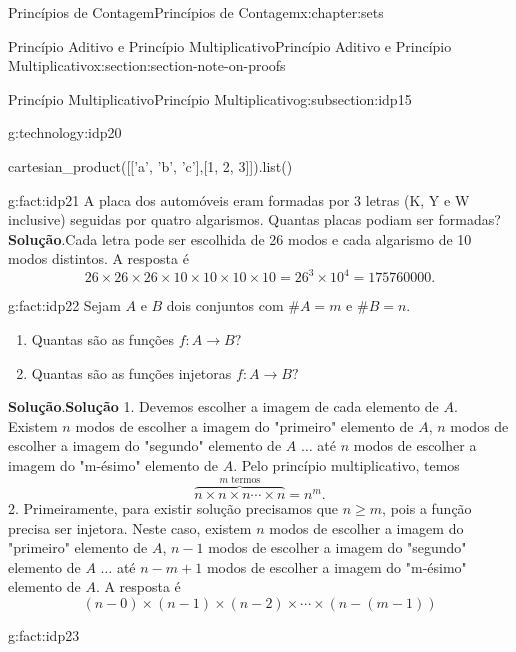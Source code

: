 \documentclass[oneside,10pt,]{book}
\newcommand{\blocktitlefont}{\relax}
\newcommand{\terminology}[1]{\textbf{#1}}
\numberwithin{equation}{section}
\begin{document}
\begin{chapterptx}{Princípios de Contagem}{}{Princípios de Contagem}{}{}{x:chapter:sets}
\begin{sectionptx}{Princípio Aditivo e Princípio Multiplicativo}{}{Princípio Aditivo e Princípio Multiplicativo}{}{}{x:section:section-note-on-proofs}
\begin{subsectionptx}{Princípio Multiplicativo}{}{Princípio Multiplicativo}{}{}{g:subsection:idp15}
\begin{technology}{}{g:technology:idp20}
\begin{sageinput}
cartesian_product([['a', 'b', 'c'],[1, 2, 3]]).list()
\end{sageinput}
\begin{sageoutput}
[('a', 1),
 ('a', 2),
 ('a', 3),
 ('b', 1),
 ('b', 2),
 ('b', 3),
 ('c', 1),
 ('c', 2),
 ('c', 3)]
\end{sageoutput}
\end{technology}
\begin{fact}{}{}{g:fact:idp21}%
A placa dos automóveis eram formadas por 3 letras (K, Y e W inclusive) seguidas por quatro algarismos. Quantas placas podiam ser formadas?%
\textbf{\blocktitlefont Solução}.\quad{}Cada letra pode ser escolhida de 26 modos e cada algarismo de 10 modos distintos. A resposta é%
\begin{equation*}
26\times26\times26\times 10\times10\times10\times10 = 26^3\times10^4 = 175760000.
\end{equation*}
%
\end{fact}
\begin{fact}{}{}{g:fact:idp22}%
Sejam \(A\) e \(B\) dois conjuntos com \(\#A=m\) e \(\#B=n\).%
\begin{enumerate}
\item{}Quantas são as funções \(f:A\rightarrow B?\)%
\item{}Quantas são as funções injetoras \(f:A\rightarrow B?\)%
\end{enumerate}
%
\textbf{\blocktitlefont Solução}.\quad{}\terminology{Solução} 1. Devemos escolher a imagem de cada elemento de \(A\). Existem \(n\) modos de escolher a imagem do "primeiro" elemento de \(A\), \(n\) modos de escolher a imagem do "segundo" elemento de \(A\) \(\ldots\) até \(n\) modos de escolher a imagem do "m-ésimo" elemento de \(A\). Pelo princípio multiplicativo, temos%
\begin{equation*}
\overbrace{n\times n \times n \cdots \times n}^{m \text{ termos}} = n^m. 
\end{equation*}
2. Primeiramente, para existir solução precisamos que \(n\geq m\), pois a função precisa ser injetora. Neste caso, existem \(n\) modos de escolher a imagem do "primeiro" elemento de \(A\), \(n-1\) modos de escolher a imagem do "segundo" elemento de \(A\) \(\ldots\) até \(n-m+1\) modos de escolher a imagem do "m-ésimo" elemento de \(A\). A resposta é%
\begin{equation*}
(n-0)\times(n-1)\times(n-2)\times \cdots \times(n-(m-1))  
\end{equation*}
%
\end{fact}
\begin{fact}{}{}{g:fact:idp23}%

\end{fact}
\end{subsectionptx}
\end{sectionptx}
\end{chapterptx}
\end{document}
